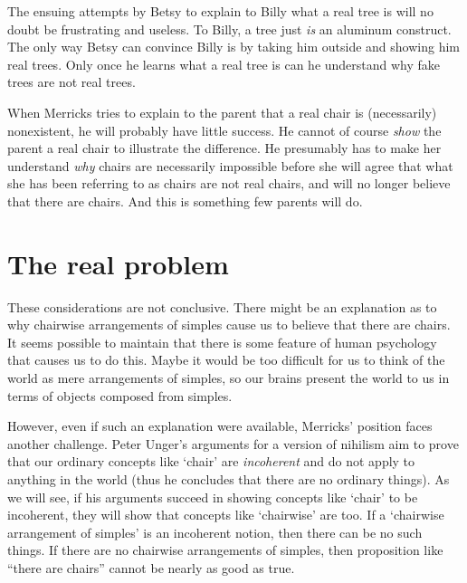 \documentclass[11pt]{standalone} \newif\ifstandlone \standalonetrue
\begin{document}
\begin{spacing}{1.25}

The ensuing attempts by Betsy to explain to Billy what a real tree is
will no doubt be frustrating and useless.  To Billy, a tree just {\em
  is} an aluminum construct.  The only way Betsy can convince Billy is
by taking him outside and showing him real trees.  Only once he learns
what a real tree is can he understand why fake trees are not real
trees.

When Merricks tries to explain to the parent that a real chair is
(necessarily) nonexistent, he will probably have little success.  He
cannot of course {\em show} the parent a real chair to illustrate the
difference.  He presumably has to make her understand {\em why} chairs
are necessarily impossible before she will agree that what she has
been referring to as chairs are not real chairs, and will no longer
believe that there are chairs.  And this is something few parents will
do.

\section{The real problem}
These considerations are not conclusive.  There might be an
explanation as to why chairwise arrangements of simples cause us to
believe that there are chairs.  It seems possible to maintain that
there is some feature of human psychology that causes us to do this.
Maybe it would be too difficult for us to think of the world as mere
arrangements of simples, so our brains present the world to us in
terms of objects composed from simples.

However, even if such an explanation were available, Merricks'
position faces another challenge.  Peter Unger's arguments for a
version of nihilism aim to prove that our ordinary concepts like
`chair' are {\em incoherent} and do not apply to anything in the world
(thus he concludes that there are no ordinary things).  As we will
see, if his arguments succeed in showing concepts like `chair' to be
incoherent, they will show that concepts like `chairwise' are too.  If
a `chairwise arrangement of simples' is an incoherent notion, then
there can be no such things.  If there are no chairwise arrangements
of simples, then proposition like ``there are chairs'' cannot be
nearly as good as true.

\ifstandalone
\end{spacing}


\fi
\end{document}
